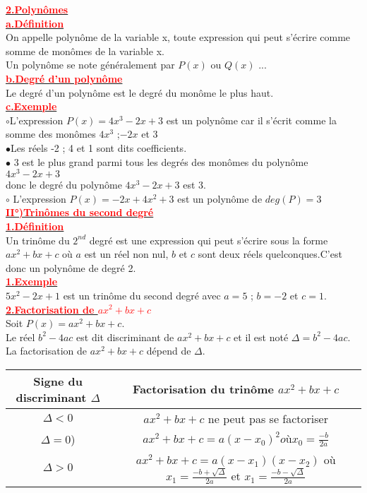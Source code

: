 \documentclass[12pt]{article}
\begin{document}
\underline{\textbf{\textcolor{red}{2.Polynômes}}}\\
\underline{\textbf{\textcolor{red}{a.Définition}}}\\
On appelle polynôme de la variable x, toute expression qui peut s'écrire comme somme de monômes de la variable x.\\
Un polynôme se note généralement par $P(x)$ ou $Q(x)$ ...\\
\underline{\textbf{\textcolor{red}{b.Degré d'un polynôme}}}\\
Le degré d'un polynôme est le degré du monôme le plus haut.\\ 
\underline{\textbf{\textcolor{red}{c.Exemple}}}\\
$\circ$L'expression $P(x)=4x^{3}-2x+3$ est un polynôme car il s'écrit comme la somme des monômes $4x^{3}$ ;$-2x$ et 3\\ %
$\bullet$Les réels -2 ; 4 et 1 sont dits coefficients.\\
$\bullet$ 3 est le plus grand parmi tous les degrés des monômes du polynôme $4x^{3}-2x+3$\\
donc le degré du polynôme $4x^{3}-2x+3$ est 3.\\
$\circ$ L'expression $P(x)=-2x+4x^{2}+3$ est un polynôme de $deg(P)=3$\\
\underline{\textbf{\textcolor{red}{II°)Trinômes du second degré}}}\\
\underline{\textbf{\textcolor{red}{1.Définition}}}\\
Un trinôme du $2^{nd}$ degré est une expression qui peut s'écrire sous la forme $ax^{2}+bx+c$ où $a$ est un réel non nul, $b$ et $c$ sont deux réels quelconques.C'est donc un polynôme de degré 2.\\ 
\underline{\textbf{\textcolor{red}{1.Exemple}}}\\
$5x^{2}-2x+1$ est un trinôme du second degré avec $a=5$ ; $b=-2$ et $c=1$.\\
\underline{\textbf{\textcolor{red}{2.Factorisation de $ax^{2}+bx+c$}}}\\
Soit $P(x)=ax^{2}+bx+c$.\\
Le réel $b^{2}-4ac$ est dit discriminant de $ax^{2}+bx+c$ et il est noté $\Delta=b^{2}-4ac$.\\ 
La factorisation de $ax^{2}+bx+c$ dépend de $\Delta$.

\begin{tabular}{|c|c|}
    \hline
    Signe du discriminant $\Delta$ & Factorisation du trinôme $ax^{2}+bx+c$ \\
    \hline
    $\Delta<0$ & $ax^{2}+bx+c$ ne peut pas se factoriser \\
    \hline
    $\Delta=0$) & $ax^{2}+bx+c=a(x-x_{0	})^{2} où x_{0}=\frac{-b}{2a}$ \\
    \hline
    $\Delta>0$ & $ax^{2}+bx+c=a(x-x_{1})(x-x_{2})$ où $x_{1}=\frac{-b+\sqrt{\Delta}}{2a}$ et $x_{1}=\frac{-b-\sqrt{\Delta}}{2a}$ \\
    \hline
\end{tabular}
\end{document}
